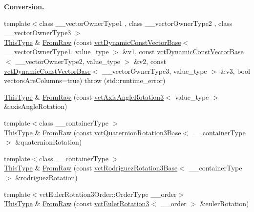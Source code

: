 \begin{Indent}{\bf Conversion.}
\begin{DoxyCompactItemize}
\item 
{\footnotesize template$<$class \+\_\+\+\_\+vector\+Owner\+Type1 , class \+\_\+\+\_\+vector\+Owner\+Type2 , class \+\_\+\+\_\+vector\+Owner\+Type3 $>$ }\\\hyperlink{classvct_matrix_rotation3_base_a027be766cb10ca3c2ad8e85c28ed0af9}{This\+Type} \& \hyperlink{classvct_matrix_rotation3_base_a3b404a43a50e4fb778d52e0ef206d4ef}{From\+Raw} (const \hyperlink{classvct_dynamic_const_vector_base}{vct\+Dynamic\+Const\+Vector\+Base}$<$ \+\_\+\+\_\+vector\+Owner\+Type1, value\+\_\+type $>$ \&v1, const \hyperlink{classvct_dynamic_const_vector_base}{vct\+Dynamic\+Const\+Vector\+Base}$<$ \+\_\+\+\_\+vector\+Owner\+Type2, value\+\_\+type $>$ \&v2, const \hyperlink{classvct_dynamic_const_vector_base}{vct\+Dynamic\+Const\+Vector\+Base}$<$ \+\_\+\+\_\+vector\+Owner\+Type3, value\+\_\+type $>$ \&v3, bool vectors\+Are\+Columns=true)  throw (std\+::runtime\+\_\+error)
\item 
\hyperlink{classvct_matrix_rotation3_base_a027be766cb10ca3c2ad8e85c28ed0af9}{This\+Type} \& \hyperlink{classvct_matrix_rotation3_base_a4ec32e08d3dd30c552bf163f2332eff2}{From\+Raw} (const \hyperlink{classvct_axis_angle_rotation3}{vct\+Axis\+Angle\+Rotation3}$<$ value\+\_\+type $>$ \&axis\+Angle\+Rotation)
\item 
{\footnotesize template$<$class \+\_\+\+\_\+container\+Type $>$ }\\\hyperlink{classvct_matrix_rotation3_base_a027be766cb10ca3c2ad8e85c28ed0af9}{This\+Type} \& \hyperlink{classvct_matrix_rotation3_base_a1d67c2b62eb53457d65b2ac0a389b500}{From\+Raw} (const \hyperlink{classvct_quaternion_rotation3_base}{vct\+Quaternion\+Rotation3\+Base}$<$ \+\_\+\+\_\+container\+Type $>$ \&quaternion\+Rotation)
\item 
{\footnotesize template$<$class \+\_\+\+\_\+container\+Type $>$ }\\\hyperlink{classvct_matrix_rotation3_base_a027be766cb10ca3c2ad8e85c28ed0af9}{This\+Type} \& \hyperlink{classvct_matrix_rotation3_base_aca9b540ee54484b458de4e0b3d9f731b}{From\+Raw} (const \hyperlink{classvct_rodriguez_rotation3_base}{vct\+Rodriguez\+Rotation3\+Base}$<$ \+\_\+\+\_\+container\+Type $>$ \&rodriguez\+Rotation)
\item 
{\footnotesize template$<$vct\+Euler\+Rotation3\+Order\+::\+Order\+Type \+\_\+\+\_\+order$>$ }\\\hyperlink{classvct_matrix_rotation3_base_a027be766cb10ca3c2ad8e85c28ed0af9}{This\+Type} \& \hyperlink{classvct_matrix_rotation3_base_a1429dd190f5b891a39827e1da8495033}{From\+Raw} (const \hyperlink{classvct_euler_rotation3}{vct\+Euler\+Rotation3}$<$ \+\_\+\+\_\+order $>$ \&euler\+Rotation)

\end{DoxyCompactItemize}
\end{Indent}
